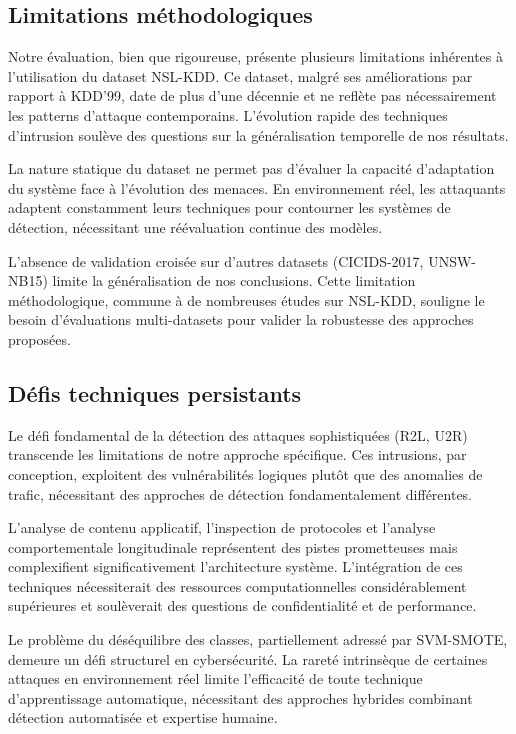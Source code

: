 \subsection{Limitations méthodologiques}

Notre évaluation, bien que rigoureuse, présente plusieurs limitations inhérentes à l'utilisation du dataset NSL-KDD. Ce dataset, malgré ses améliorations par rapport à KDD'99, date de plus d'une décennie et ne reflète pas nécessairement les patterns d'attaque contemporains. L'évolution rapide des techniques d'intrusion soulève des questions sur la généralisation temporelle de nos résultats.

La nature statique du dataset ne permet pas d'évaluer la capacité d'adaptation du système face à l'évolution des menaces. En environnement réel, les attaquants adaptent constamment leurs techniques pour contourner les systèmes de détection, nécessitant une réévaluation continue des modèles.

L'absence de validation croisée sur d'autres datasets (CICIDS-2017, UNSW-NB15) limite la généralisation de nos conclusions. Cette limitation méthodologique, commune à de nombreuses études sur NSL-KDD, souligne le besoin d'évaluations multi-datasets pour valider la robustesse des approches proposées.

\subsection{Défis techniques persistants}

Le défi fondamental de la détection des attaques sophistiquées (R2L, U2R) transcende les limitations de notre approche spécifique. Ces intrusions, par conception, exploitent des vulnérabilités logiques plutôt que des anomalies de trafic, nécessitant des approches de détection fondamentalement différentes.

L'analyse de contenu applicatif, l'inspection de protocoles et l'analyse comportementale longitudinale représentent des pistes prometteuses mais complexifient significativement l'architecture système. L'intégration de ces techniques nécessiterait des ressources computationnelles considérablement supérieures et soulèverait des questions de confidentialité et de performance.

Le problème du déséquilibre des classes, partiellement adressé par SVM-SMOTE, demeure un défi structurel en cybersécurité. La rareté intrinsèque de certaines attaques en environnement réel limite l'efficacité de toute technique d'apprentissage automatique, nécessitant des approches hybrides combinant détection automatisée et expertise humaine.

